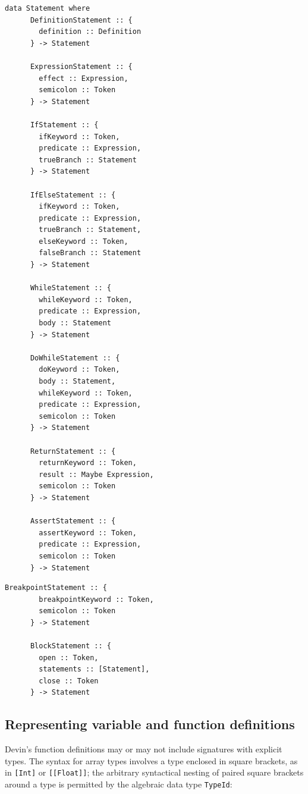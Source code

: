 \documentclass[UdineBachThesis,american,11pt]{PhdThesis}
\begin{document}
  \begin{Verbatim}[gobble=4,fontsize=\small]
    data Statement where
      DefinitionStatement :: {
        definition :: Definition
      } -> Statement

      ExpressionStatement :: {
        effect :: Expression,
        semicolon :: Token
      } -> Statement

      IfStatement :: {
        ifKeyword :: Token,
        predicate :: Expression,
        trueBranch :: Statement
      } -> Statement

      IfElseStatement :: {
        ifKeyword :: Token,
        predicate :: Expression,
        trueBranch :: Statement,
        elseKeyword :: Token,
        falseBranch :: Statement
      } -> Statement

      WhileStatement :: {
        whileKeyword :: Token,
        predicate :: Expression,
        body :: Statement
      } -> Statement

      DoWhileStatement :: {
        doKeyword :: Token,
        body :: Statement,
        whileKeyword :: Token,
        predicate :: Expression,
        semicolon :: Token
      } -> Statement

      ReturnStatement :: {
        returnKeyword :: Token,
        result :: Maybe Expression,
        semicolon :: Token
      } -> Statement

      AssertStatement :: {
        assertKeyword :: Token,
        predicate :: Expression,
        semicolon :: Token
      } -> Statement
  \end{Verbatim}

  \pagebreak

  \begin{Verbatim}[gobble=4,fontsize=\small]
      BreakpointStatement :: {
        breakpointKeyword :: Token,
        semicolon :: Token
      } -> Statement

      BlockStatement :: {
        open :: Token,
        statements :: [Statement],
        close :: Token
      } -> Statement
  \end{Verbatim}

  \subsection{Representing variable and function definitions}

  Devin's function definitions may or may not include signatures with explicit
  types. The syntax for array types involves a type enclosed in square brackets,
  as in \mbox{\texttt{[Int]}} or \mbox{\texttt{[[Float]]}}; the arbitrary
  syntactical nesting of paired square brackets around a type is permitted by
  the algebraic data type \mbox{\texttt{TypeId}}:
\end{document}
